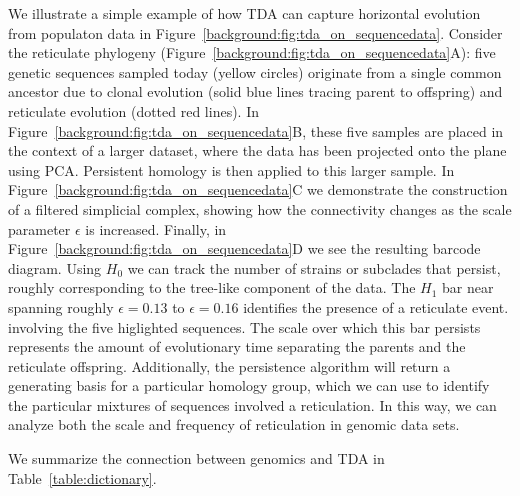 We illustrate a simple example of how TDA can capture horizontal evolution from populaton data in Figure~\ref{background:fig:tda_on_sequencedata}.
Consider the reticulate phylogeny (Figure~\ref{background:fig:tda_on_sequencedata}A): five genetic sequences sampled today (yellow circles) originate from a single common ancestor due to clonal evolution (solid blue lines tracing parent to offspring) and reticulate evolution (dotted red lines).
In Figure~\ref{background:fig:tda_on_sequencedata}B, these five samples are placed in the context of a larger dataset, where the data has been projected onto the plane using PCA.
Persistent homology is then applied to this larger sample.
In Figure~\ref{background:fig:tda_on_sequencedata}C we demonstrate the construction of a filtered simplicial complex, showing how the connectivity changes as the scale parameter $\epsilon$ is increased.
Finally, in Figure~\ref{background:fig:tda_on_sequencedata}D we see the resulting barcode diagram.
Using $H_0$ we can track the number of strains or subclades that persist, roughly corresponding to the tree-like component of the data.
The $H_1$ bar near spanning roughly $\epsilon=0.13$ to $\epsilon=0.16$ identifies the presence of a reticulate event. involving the five higlighted sequences.
The scale over which this bar persists represents the amount of evolutionary time separating the parents and the reticulate offspring.
Additionally, the persistence algorithm will return a generating basis for a particular homology group, which we can use to identify the particular mixtures of sequences involved a reticulation.
In this way, we can analyze both the scale and frequency of reticulation in genomic data sets.

We summarize the connection between genomics and TDA in Table~\ref{table:dictionary}.


